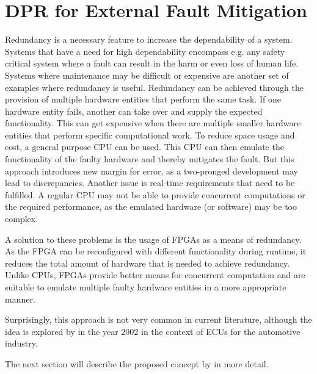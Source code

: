 \section{\gls{DPR} for External Fault Mitigation}\label{ExternalFaults}
Redundancy is a necessary feature to increase the dependability of a system.
Systems that have a need for high dependability encompass e.g. any safety critical system where a fault can result in the harm or even loss of human life.
Systems where maintenance may be difficult or expensive are another set of examples where redundancy is useful.
Redundancy can be achieved through the provision of multiple hardware entities that perform the same task.
If one hardware entity fails, another can take over and supply the expected functionality.
This can get expensive when there are multiple smaller hardware entities that perform specific computational work. 
To reduce space usage and cost, a general purpose \gls{CPU} can be used.
This \gls{CPU} can then emulate the functionality of the faulty hardware and thereby mitigates the fault. 
But this approach introduces new margin for error, as a two-pronged development may lead to discrepancies.
Another issue is real-time requirements that need to be fulfilled.
A regular \gls{CPU} may not be able to provide concurrent computations or the required performance, as the emulated hardware (or software) may be too complex.

A solution to these problems is the usage of \glspl{FPGA} as a means of redundancy. 
As the \gls{FPGA} can be reconfigured with different functionality during runtime, it reduces the total amount of hardware that is needed to achieve redundancy.
Unlike \glspl{CPU}, \glspl{FPGA} provide better means for concurrent computation and are suitable to emulate multiple faulty hardware entities in a more appropriate manner. %

Surprisingly, this approach is not very common in current literature, although the idea is explored by \cite{crdl_fail-safe_nodate} in the year 2002 in the context of \glspl{ECU} for the automotive industry.

The next section will describe the proposed concept by \cite{crdl_fail-safe_nodate} in more detail.

